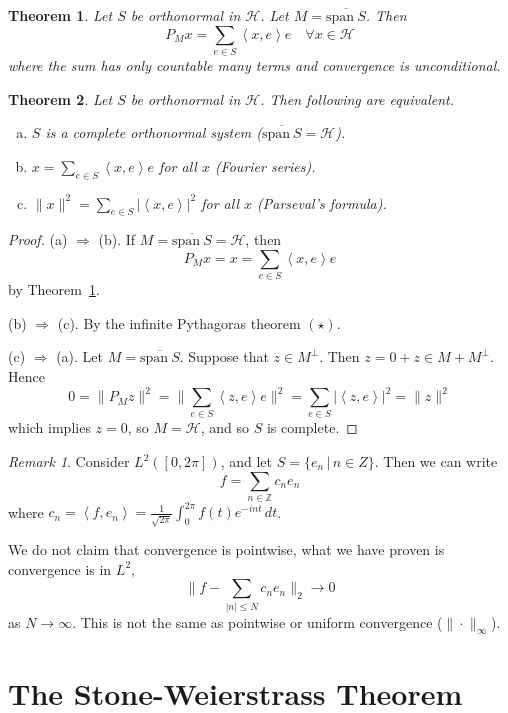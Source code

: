 \documentclass[justified]{tufte-book}
\theoremstyle{plain}%
\newtheorem{thm}{Theorem}[chapter]
\theoremstyle{definition}
\theoremstyle{remark}
\newtheorem*{rem}{Remark}
\renewcommand{\H}{\mathcal{H}}
\newcommand{\Z}{\mathbb{Z}}
\newcommand{\iprod}[1]{\left\langle #1 \right\rangle}
\newcommand{\spans}{\text{span}\ }
\begin{document}
\begin{thm}\label{thm:fourier}
  Let $S$ be orthonormal in $\H$.  Let $M = \overline{\spans S}$.  Then \[
      P_Mx = \sum_{e \in S} \iprod{x, e} e \quad \forall x \in \H
  \] where the sum has only countable many terms and convergence is unconditional.
\end{thm}

\begin{thm}
  Let $S$ be orthonormal in $\H$.  Then following are equivalent.
  \begin{enumerate}[(a)]
      \item $S$ is a complete orthonormal system ($\overline{\spans S} = \H$).
      \item $x = \sum_{e \in S} \iprod{x,e} e$ for all $x$ (Fourier series).
      \item $\| x \|^2 = \sum_{e \in S} |\iprod{x,e}|^2$ for all $x$ (Parseval's formula).
  \end{enumerate}
\end{thm}

\begin{proof}
  (a) $\Rightarrow$ (b).  If $M = \overline{\spans S} = \H$, then \[
      P_M x = x = \sum_{e \in S} \iprod{x,e} e
  \] by Theorem~\ref{thm:fourier}.
  
  (b) $\Rightarrow$ (c).  By the infinite Pythagoras theorem $(\star)$.  
  
  (c) $\Rightarrow$ (a).  Let $M = \overline{\spans S}$. Suppose that $z \in M^\perp$.  Then $z = 0 + z \in M + M^\perp$.  Hence \[
      0 = \| P_M z \|^2 = \|\sum_{e \in S} \iprod{z,e} e \|^2 = \sum_{e \in S} |\iprod{z,e} |^2 = \| z \|^2 
  \] which implies $z = 0$, so $M = \H$, and so $S$ is complete.
\end{proof}

\begin{rem}
  Consider $L^2([0,2\pi])$, and let $S = \{ e_n \, | \, n \in Z \}$.  Then we can write \[
       f = \sum_{ n \in \Z} c_n e_n
  \] where $c_n = \iprod{f,e_n} = \frac{1}{\sqrt{2 \pi}} \int_0^{2\pi} f(t) e^{-in t} \, dt$.  
  
  We do not claim that convergence is pointwise, what we have proven is convergence is in $L^2$, \[
      \| f - \sum_{|n| \leq N} c_n e_n \|_2 \rightarrow 0
  \] as $N \rightarrow \infty$.  This is not the same as pointwise or uniform convergence ($\| \cdot \|_\infty$).  
\end{rem}

\section{The Stone-Weierstrass Theorem} %
\label{sec:the_stone_weierstrass_theorem}
\end{document}
